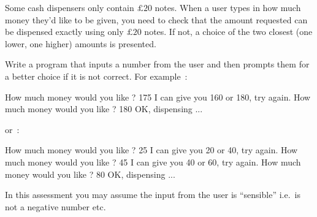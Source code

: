 
Some cash dispensers only contain
$\pounds 20$ notes. When a user types in how much money
they'd like to be given, you need to check that the amount requested
can be dispensed exactly using only $\pounds 20$ notes. If not, a choice
of the two closest (one lower, one higher) amounts is presented.

\begin{exercise}
Write a program that inputs a number from the user and then
prompts them for a better choice if it is not correct. For example~:

\begin{terminaloutput}
How much money would you like ? 175
I can give you 160 or 180, try again.
How much money would you like ? 180
OK, dispensing ...
\end{terminaloutput}

or~:

\begin{terminaloutput}
How much money would you like ? 25
I can give you 20 or 40, try again.
How much money would you like ? 45
I can give you 40 or 60, try again.
How much money would you like ? 80
OK, dispensing ...
\end{terminaloutput}

In this assessment you may assume the input from the
user is ``sensible'' i.e.\ is not a negative number etc.
\end{exercise}
